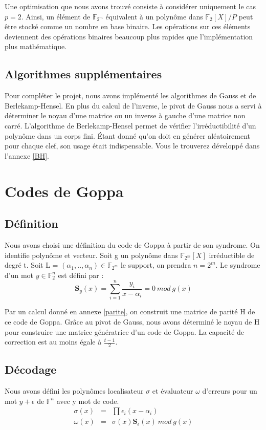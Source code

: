 \documentclass{article}
\begin{document}
			Une optimisation que nous avons trouvé consiste à considérer uniquement le cas $p = 2$.
			Ainsi, un élément de $\mathbb{F}_{2^{m}}$ équivalent à un polynôme dans $\mathbb{F}_{2}[X]/P$ peut être stocké comme un nombre en base binaire.
			Les opérations sur ces éléments deviennent des opérations binaires beaucoup plus rapides que l'implémentation plus mathématique.

		\subsection*{Algorithmes supplémentaires}
			Pour compléter le projet, nous avons implémenté les algorithmes de Gauss et de Berlekamp-Hensel.
			En plus du calcul de l'inverse, le pivot de Gauss nous a servi à déterminer le noyau d'une matrice ou un inverse à gauche d'une matrice non carré.
			L'algorithme de Berlekamp-Hensel \cite{berlekamp} permet de vérifier l'irréductibilité d'un polynôme dans un corps fini.
			Étant donné qu'on doit en générer aléatoirement pour chaque clef, son usage était indispensable.
			Vous le trouverez développé dans l'annexe \ref{BH}.

	\section{Codes de Goppa}

		\subsection*{Définition}
			Nous avons choisi une définition du code de Goppa à partir de son syndrome.
			On identifie polynôme et vecteur.
			Soit g un polynôme dans $\mathbb{F}_{2^{m}}[X]$ irréductible de degré t.
			Soit L = $ (\alpha_{1},..,\alpha_{n})  \in \mathbb{F}_{2^{m}}$ le support, on prendra $n = 2^{m}$.
			Le syndrome d'un mot $y \in \mathbb{F}_{2}^{n}$ est défini par :
			$$
				\mathbf{S}_{y}(x) = \sum_{i=1}^{n} \frac{y_{i}}{x-\alpha_{i}} = 0 \ mod \ g(x)
			$$

			Par un calcul donné en annexe \ref{parite}, on construit une matrice de parité H de ce code de Goppa.
			Grâce au pivot de Gauss, nous avons déterminé le noyau de H pour construire une matrice génératrice d'un code de Goppa.
			La capacité de correction est au moins égale à $\frac{t-1}{2}$.


		\subsection*{Décodage}
			Nous avons défini les polynômes localisateur $\sigma$ et évaluateur $\omega$ d'erreurs pour un mot $y + \epsilon$ de $\mathbb{F}^{n}$ avec y mot de code.
			\begin{eqnarray}
				\sigma(x) &=& \prod \epsilon_{i}(x - \alpha_{i}) \\
				\omega(x) &=& \sigma(x) \mathbf{S}_{\epsilon}(x) \ mod \ g(x)
			\end{eqnarray}
\end{document}
